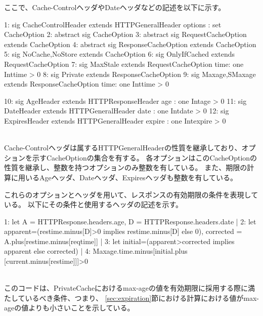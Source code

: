 \documentclass{css}
\begin{document}
\color{red}
ここで、Cache-ControlヘッダやDateヘッダなどの記述を以下に示す。\\\hrulefill
\begin{small}
\begin{verbatimtab}[4]
1:	sig CacheControlHeader extends HTTPGeneralHeader
		{options : set CacheOption}
2:	abstract sig CacheOption{}
3:	abstract sig RequestCacheOption
		extends CacheOption{}
4:	abstract sig ResponseCacheOption
		extends CacheOption{}
5:	sig NoCache,NoStore extends CacheOption{}
6:	sig OnlyIfCached extends RequestCacheOption{}
7:	sig MaxStale extends RequestCacheOption
		{time: one Int}{time > 0}
8:	sig Private extends ResponseCacheOption{}
9:	sig Maxage,SMaxage extends ResponseCacheOption
		{time: one Int}{time > 0}

10: sig AgeHeader extends HTTPResponseHeader
		{age : one Int}{age > 0}
11:	sig DateHeader extends HTTPGeneralHeader
		{date : one Int}{date > 0}
12:	sig ExpiresHeader extends HTTPGeneralHeader
		{expire : one Int}{expire > 0}
\end{verbatimtab}
\end{small}
\hrulefill\\
Cache-Controlヘッダは属するHTTPGeneralHeaderの性質を継承しており、オプションを示すCacheOptionの集合を有する。
各オプションはこのCacheOptionの性質を継承し、整数を持つオプションのみ整数を有している。
また、期限の計算に用いるAgeヘッダ、Dateヘッダ、Expiresヘッダも整数を有している。
\color{black}

これらのオプションとヘッダを用いて、レスポンスの有効期限の条件を表現している。
以下にその条件と使用するヘッダの記述を示す。\\\hrulefill
\begin{small}
\begin{verbatimtab}[4]
1:	let A = HTTPResponse.headers.age, 
	D = HTTPResponse.headers.date |
2:		let apparent=(restime.minus[D]>0 implies
		restime.minus[D] else 0), corrected = 
		A.plus[restime.minus[reqtime]] | 
3:			let initial=(apparent>corrected 
			implies apparent else corrected) | 
4:				Maxage.time.minus[initial.plus
				[current.minus[restime]]]>0
\end{verbatimtab}
\end{small}
\hrulefill\\
このコードは、PrivateCacheにおけるmax-ageの値を有効期限に採用する際に満たしているべき条件、つまり、
\ref{sec:expiration}節における計算における値がmax-ageの値よりも小さいことを示している。
\end{document}
